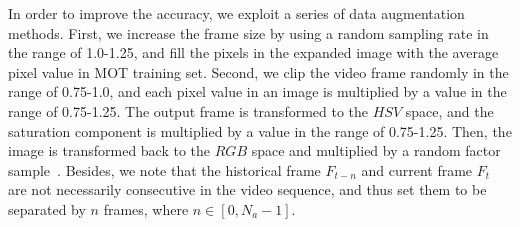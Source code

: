 \documentclass[acmsmall]{acmart}
\begin{document}
\label{sec:PP}
{In order to improve the accuracy, we exploit a series of data augmentation methods.
First,} we increase the frame size by using a random sampling rate in the range of 1.0-1.25, 
and fill the pixels in the expanded image with the average pixel value in MOT training set. 
{Second,} we clip the video frame randomly in the range of 0.75-1.0,
and each pixel value in an image is multiplied by a value in the range of 0.75-1.25. 
The output frame is transformed to the $HSV$ space, 
and the saturation component is multiplied by a value in the range of 0.75-1.25. 
{Then,} the image is transformed back to the $RGB$ space and multiplied by a random factor sample~\cite{Liu2016}. 
%
{Besides,} we note that the historical frame $F_{t-n}$ and current frame $F_t$ are not necessarily consecutive in the video sequence,
and thus set them to be separated by $n$ frames, where $n \in [0, N_a-1] $. 
%
%
\end{document}
